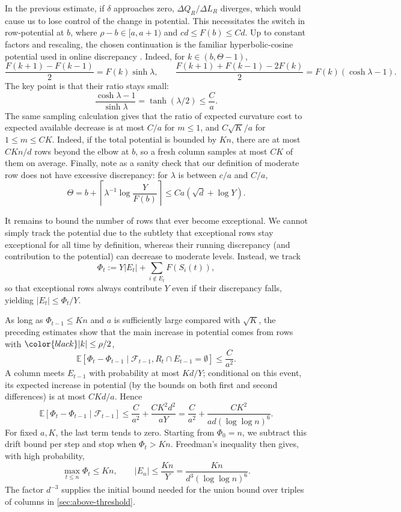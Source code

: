 \documentclass[reqno,english]{amsart}
\newcommand*{\EE}{\mathbb E}
\newcommand*{\calF}{\mathcal F}
\theoremstyle{definition}
\begin{document}
In the previous estimate, if $\delta$ approaches zero, $\Delta Q_R/\Delta L_R$ diverges, which would cause us to lose control of the change in potential. This necessitates the switch in row-potential at $b$, where
$\rho-b\in[a,a+1)$ and $cd\le F(b)\le Cd$. Up to constant factors and
rescaling, the chosen continuation is the familiar hyperbolic-cosine potential
used in online discrepancy
\cite{spencer-online,bansal-online,bansal-spencer,matrixspencer-cosine}. Indeed, for $k \in (b,\Theta-1)$, 
\[
 \frac{F(k+1)-F(k-1)}2=F(k)\sinh\lambda,
 \qquad
 \frac{F(k+1)+F(k-1)-2F(k)}2=F(k)(\cosh\lambda-1).
\]
The key point is that their ratio stays small: 
\[
 \frac{\cosh\lambda-1}{\sinh\lambda}
 =\tanh(\lambda/2)\le\frac Ca.
\]
The same sampling calculation gives that {\color{black}the ratio of expected curvature cost to expected available decrease} is at most
$C/a$ for $m\le1$, and $C\sqrt K/a$ for $1\le m\le CK$. Indeed, if the total potential is bounded by $Kn$, there
are at most $CKn/d$ rows beyond the elbow at $b$, so a fresh column
samples at most $CK$ of them on average. 
Finally, note as a sanity check that our definition of moderate row does not have excessive discrepancy: for $\lambda$ is between $c/a$ and $C/a$,
\[
 \Theta=b+\left\lceil\lambda^{-1}\log\frac{Y}{F(b)}\right\rceil
 \le Ca(\sqrt d+\log Y).
\]



It remains to bound the number of rows that ever become exceptional. We cannot simply track the potential due to the subtlety that exceptional rows stay exceptional for all time by definition, whereas their running discrepancy (and contribution to the potential) can decrease to moderate levels. Instead, we track
\[
 \Phi_t:=Y|E_t|+\sum_{i\notin E_t}F(S_i(t)),
\]
so that exceptional rows always contribute $Y$ even if their discrepancy falls,
yielding $|E_t|\le\Phi_t/Y$.

As long as $\Phi_{t-1}\le Kn$ and $a$ is sufficiently large compared with
$\sqrt K$, the preceding estimates show that the main increase in potential comes from rows with ${\color{black}|k|} \le \rho/2$, 
\[
 \EE[\Phi_t-\Phi_{t-1}\mid\calF_{t-1},R_t\cap E_{t-1}=\emptyset]
 \le \frac{C}{a^2}.
\]
A column meets $E_{t-1}$ with probability at most $Kd/Y$; conditional
on this event, its expected increase in potential ({\color{black}by the bounds on both first and second differences}) is at most
$CKd/a$. Hence
\[
 \EE[\Phi_t-\Phi_{t-1}\mid\calF_{t-1}]
 \le\frac{C}{a^2}+\frac{CK^2d^2}{aY}
 =\frac{C}{a^2}+\frac{CK^2}{ad(\log\log n)^6}.
\]
For fixed $a,K$, the last term tends to zero.
Starting from $\Phi_0=n$, we subtract this drift bound per step and stop
when $\Phi_t>Kn$. Freedman's inequality then gives, with high probability,
\[
 \max_{t\le n}\Phi_t\le Kn,
 \qquad
 |E_n|\le\frac{Kn}{Y}=\frac{Kn}{d^3(\log\log n)^6}.
\]
The factor $d^{-3}$ supplies the initial bound needed for the union
bound over triples of columns in \cref{sec:above-threshold}.
\end{document}
